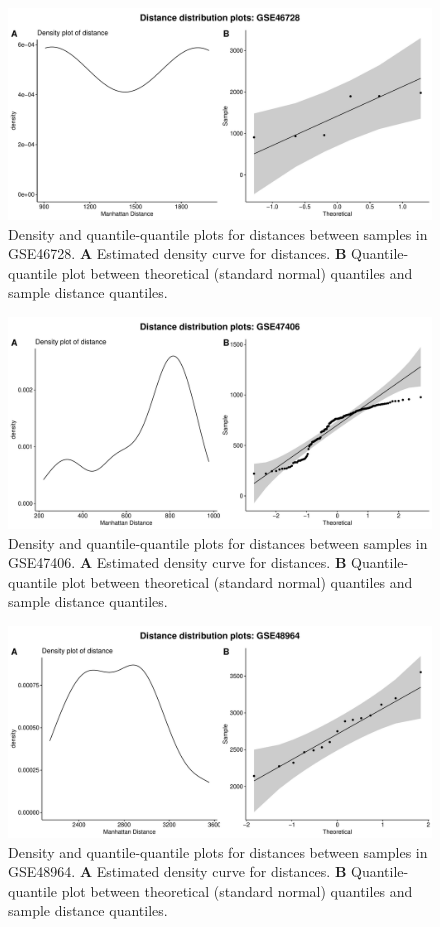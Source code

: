 \documentclass[10pt,letterpaper]{article}\usepackage[]{graphicx}\usepackage[]{color}
\begin{document}
\begin{figure}[H]
	\includegraphics[width=\textwidth]{manhattan-distance_hist_GSE46728.pdf}
	\caption{Density and quantile-quantile plots for distances between samples in GSE46728. \textbf{A} Estimated density curve for distances. \textbf{B} Quantile-quantile plot between theoretical (standard normal) quantiles and sample distance quantiles.}
\end{figure}

\begin{figure}[H]
	\includegraphics[width=\textwidth]{manhattan-distance_hist_GSE47406.pdf}
	\caption{Density and quantile-quantile plots for distances between samples in GSE47406. \textbf{A} Estimated density curve for distances. \textbf{B} Quantile-quantile plot between theoretical (standard normal) quantiles and sample distance quantiles.}
\end{figure}

\begin{figure}[H]
	\includegraphics[width=\textwidth]{manhattan-distance_hist_GSE48964.pdf}
	\caption{Density and quantile-quantile plots for distances between samples in GSE48964. \textbf{A} Estimated density curve for distances. \textbf{B} Quantile-quantile plot between theoretical (standard normal) quantiles and sample distance quantiles.}
\end{figure}
\end{document}
